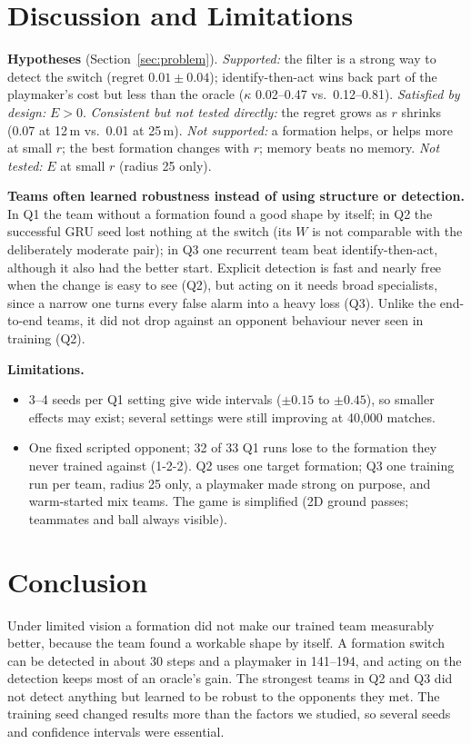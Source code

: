 \documentclass{article}
\begin{document}
\section{Discussion and Limitations}
\label{sec:discussion}

\textbf{Hypotheses} (Section~\ref{sec:problem}). \emph{Supported:} the filter is a strong way to detect the switch
(regret $0.01\pm0.04$); identify-then-act wins back part of the playmaker's cost but less than the oracle ($\kappa$
0.02--0.47 vs.\ 0.12--0.81). \emph{Satisfied by design:} $E>0$. \emph{Consistent but not tested directly:} the regret grows
as $r$ shrinks (0.07 at 12\,m vs.\ 0.01 at 25\,m). \emph{Not supported:} a formation helps, or helps more at small
$r$; the best formation changes with $r$; memory beats no memory. \emph{Not tested:} $E$ at small $r$ (radius 25 only).

\textbf{Teams often learned robustness instead of using structure or detection.} In Q1 the team without a formation
found a good shape by itself; in Q2 the successful GRU seed lost nothing at the switch (its $W$ is not comparable with
the deliberately moderate pair); in Q3 one recurrent team beat identify-then-act, although it also had the better
start. Explicit detection is fast and nearly free when the change is easy to see (Q2),
but acting on it needs broad specialists, since a narrow one turns every false alarm into a heavy loss (Q3). Unlike the
end-to-end teams, it did not drop against an opponent behaviour never seen in training (Q2).

\textbf{Limitations.}
\begin{itemize}[leftmargin=1.5em]
\item 3--4 seeds per Q1 setting give wide intervals ($\pm0.15$ to $\pm0.45$), so smaller effects may exist; several
settings were still improving at 40{,}000 matches.
\item One fixed scripted opponent; 32 of 33 Q1 runs lose to the formation they never trained against (1-2-2). Q2 uses
one target formation; Q3 one training run per team, radius 25 only, a playmaker made strong on purpose, and
warm-started mix teams. The game is simplified (2D ground passes; teammates and ball always visible).
\end{itemize}

\section{Conclusion}
\label{sec:conclusion}
Under limited vision a formation did not make our trained team measurably better, because the team found a workable
shape by itself. A formation switch can be detected in about 30 steps and a playmaker in 141--194, and acting on the
detection keeps most of an oracle's gain. The strongest teams in Q2 and Q3 did not detect anything but learned to be
robust to the opponents they met. The training seed changed results more than the factors we studied, so several
seeds and confidence intervals were essential.
\end{document}
